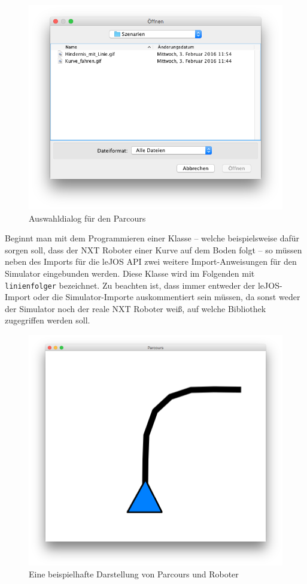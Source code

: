 \documentclass[paper=a4, DIV=calc, BCOR=12mm, twoside=on, onecolumn=on, open = right, titlepage =on, parskip =half-, headsepline = on, footsepline = off, chapterprefix = off, appendixprefix = on, fontsize = 12pt, numbers = noenddot, abstract = on]{scrbook}
\begin{document}
\begin{figure}[htb]
\centering
\includegraphics[width=\textwidth]{images/dialog_szenarien.png} 
\caption{Auswahldialog für den Parcours}
\label{fig:auswahldialog}
\end{figure}

Beginnt man mit dem Programmieren einer Klasse -- welche beispielsweise dafür sorgen soll, dass der NXT Roboter einer Kurve auf dem Boden folgt -- so müssen neben des Imports für die leJOS API zwei weitere Import-Anweisungen für den Simulator eingebunden werden. Diese Klasse wird im Folgenden mit \texttt{linienfolger} bezeichnet.
Zu beachten ist, dass immer entweder der leJOS-Import oder die Simulator-Importe auskommentiert sein müssen, da sonst weder der Simulator noch der reale NXT Roboter weiß, auf welche Bibliothek zugegriffen werden soll.


\begin{figure}[tb]
\centering
\includegraphics[width=\textwidth]{images/simparcours_kurve.png} 
\caption{Eine beispielhafte Darstellung von Parcours und Roboter}
\label{fig:simparcours_kurve}
\end{figure}
\end{document}
